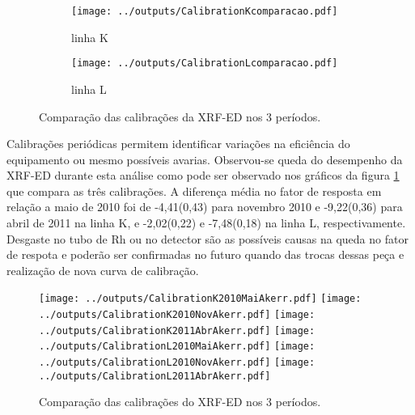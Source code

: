 \begin{figure}[H]
  \begin{subfigure}[b]{0.5\textwidth}
    \texttt{[image: ../outputs/CalibrationKcomparacao.pdf]}
    \caption{linha K}
  \end{subfigure}%
  \begin{subfigure}[b]{0.5\textwidth}
    \texttt{[image: ../outputs/CalibrationLcomparacao.pdf]}
    \caption{linha L}
  \end{subfigure}
  \caption{Comparação das calibrações da XRF-ED nos 3 períodos. 
          \label{fig:compara_calibracao}}
\end{figure}

Calibrações periódicas permitem identificar variações na eficiência 
do equipamento ou mesmo possíveis avarias. Observou-se queda do desempenho da 
XRF-ED durante esta análise como pode ser observado nos gráficos da figura 
\ref{fig:compara_calibracao} que compara as três calibrações. 
A diferença média no fator de resposta em relação a maio de 2010 foi de 
-4,41(0,43) para novembro 2010 e -9,22(0,36) para abril de 2011 na linha K, 
e -2,02(0,22) e -7,48(0,18) na linha L, respectivamente. Desgaste no tubo 
de Rh ou no detector são as possíveis causas na queda no fator de respota 
e poderão ser confirmadas no futuro quando das trocas dessas peça e realização
de nova curva de calibração.

\begin{landscape}
\begin{figure}
    \centering
    \texttt{[image: ../outputs/CalibrationK2010MaiAkerr.pdf]}
    \texttt{[image: ../outputs/CalibrationK2010NovAkerr.pdf]}
    \texttt{[image: ../outputs/CalibrationK2011AbrAkerr.pdf]}
    \texttt{[image: ../outputs/CalibrationL2010MaiAkerr.pdf]}
    \texttt{[image: ../outputs/CalibrationL2010NovAkerr.pdf]}
    \texttt{[image: ../outputs/CalibrationL2011AbrAkerr.pdf]}
    \caption{Comparação das calibrações do XRF-ED nos 3 períodos. 
            \label{fig:edx_calib3}}
\end{figure}
\end{landscape}

\begin{landscape}
  
\end{landscape}

\begin{landscape}
  
\end{landscape}
